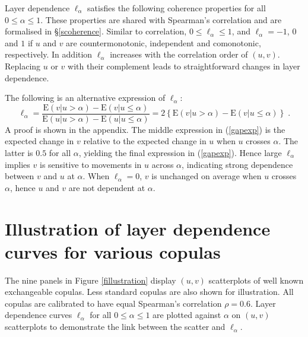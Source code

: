\documentclass[authoryear]{elsarticle}
\newcommand{\cov}{{\rm cov}}
\newcommand{\E}{{\mathrm E}}
\newcommand{\cor}{\mathrm{cor}}
\newcommand{\cq}{\ ,\quad }
\newcommand{\eref}[1]{(\ref{#1})}
\newcommand{\fref}[1]{Figure \ref{#1}}
\newcommand{\sref}[1]{\S\ref{#1}}
\begin{document}
Layer dependence $\ell_\alpha$ satisfies the following coherence properties for all $0\le\alpha\le 1$. These properties are shared with Spearman's correlation and are formalised in \sref{scoherence}. Similar to correlation, $0\le\ell_\alpha\le 1$, and $\ell_\alpha=-1$, $0$ and $1$ if $u$ and $v$ are countermonotonic, independent and comonotonic, respectively. In addition $\ell_\alpha$ increases with the correlation order of $(u,v)$. Replacing $u$ or $v$ with their complement leads to straightforward changes in layer dependence.

The following is an alternative expression of $\ell_\alpha$:
\begin{equation}\label{gapexp}
\ell_\alpha = \frac{\E(v|u>\alpha)-\E(v|u\leq \alpha)}{\E(u|u>\alpha)-\E(u|u\leq \alpha)}
=2 \left\{\E(v|u>\alpha)-\E(v|u\leq \alpha)\right\}\;.
\end{equation}
A proof is shown in the appendix. The middle expression in \eref{gapexp} is the expected change in $v$ relative to the expected change in $u$ when $u$ crosses $\alpha$. The latter is $0.5$ for all $\alpha$, yielding the final expression in \eref{gapexp}. Hence large $\ell_\alpha$ implies $v$ is sensitive to movements in $u$ across $\alpha$, indicating strong dependence between $v$ and $u$ at $\alpha$. When $\ell_\alpha=0$, $v$ is unchanged on average when $u$ crosses $\alpha$, hence $u$ and $v$ are not dependent at $\alpha$.

\section{Illustration of layer dependence curves for various copulas}\label{sldcurve}

The nine panels in \fref{fillustration} display $(u,v)$ scatterplots of well known exchangeable copulas. Less standard copulas are also shown for illustration. All copulas are calibrated to have equal Spearman's correlation $\rho=0.6$. Layer dependence curves $\ell_\alpha$ for all $0\le\alpha\le 1$ are plotted against $\alpha$ on $(u,v)$ scatterplots to demonstrate the link between the scatter and $\ell_\alpha$.
\end{document}
